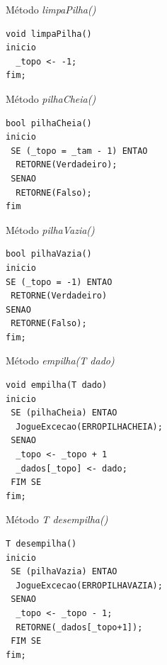 \documentclass[12pt,table,xcolor={dvipsnames}]{beamer}
\begin{document}
\begin{frame}[fragile]{Método \textit{limpaPilha()}}
\begin{lstlisting}
void limpaPilha()
inicio
  _topo <- -1;
fim;
\end{lstlisting}
\end{frame}

\begin{frame}[fragile]{Método \textit{pilhaCheia()}}
\begin{lstlisting}
bool pilhaCheia()
inicio
 SE (_topo = _tam - 1) ENTAO
  RETORNE(Verdadeiro);
 SENAO
  RETORNE(Falso);
fim
\end{lstlisting}
\end{frame}

\begin{frame}[fragile]{Método \textit{pilhaVazia()}}
\begin{lstlisting}
bool pilhaVazia()
inicio
SE (_topo = -1) ENTAO
 RETORNE(Verdadeiro)
SENAO
 RETORNE(Falso);
fim;
\end{lstlisting}
\end{frame}

\begin{frame}[fragile]{Método \textit{empilha(T dado)}}
\begin{lstlisting}
void empilha(T dado)
inicio
 SE (pilhaCheia) ENTAO
  JogueExcecao(ERROPILHACHEIA);
 SENAO
  _topo <- _topo + 1
  _dados[_topo] <- dado;
 FIM SE
fim;
\end{lstlisting}
\end{frame}

\begin{frame}[fragile]{Método \textit{T desempilha()}}
\begin{lstlisting}
T desempilha()
inicio
 SE (pilhaVazia) ENTAO
  JogueExcecao(ERROPILHAVAZIA);
 SENAO
  _topo <- _topo - 1;
  RETORNE(_dados[_topo+1]);
 FIM SE
fim;
\end{lstlisting}
\end{frame}
\end{document}
